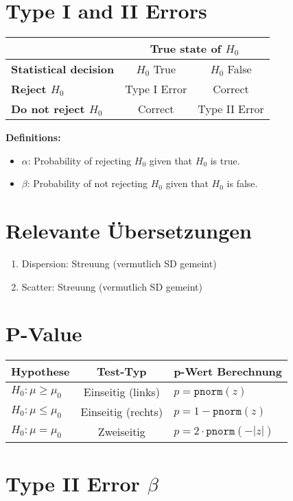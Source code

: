 
\section{Type I and II Errors}
\noindent
\begin{tabular}{|l|c|c|}
\hline
& \multicolumn{2}{c|}{\textbf{True state of } $H_0$}\\
\hline
\textbf{Statistical decision} & $H_0$ True & $H_0$ False\\
\hline
\textbf{Reject $H_0$} & Type I Error & Correct\\
\hline
\textbf{Do not reject $H_0$} & Correct & Type II Error\\
\hline
\end{tabular}


\textbf{Definitions:}
\begin{itemize}
    \item $\alpha$: Probability of rejecting $H_0$ given that $H_0$ is true.
    \item $\beta$: Probability of not rejecting $H_0$ given that $H_0$ is false.
\end{itemize}

\section{Relevante Übersetzungen}
\begin{enumerate}
    \item Dispersion: Streuung (vermutlich SD gemeint)
    \item Scatter: Streuung (vermutlich SD gemeint)
\end{enumerate}
\section{P-Value}
\noindent
\noindent
\begin{tabular}{lcl}
  \toprule
  \textbf{Hypothese}         & \textbf{Test-Typ}    & \textbf{p-Wert Berechnung} \\
  \midrule
  \(H_0: \mu \ge \mu_0\)      & Einseitig (links)   & \(p = \mathtt{pnorm}(z)\)   \\
  \(H_0: \mu \le \mu_0\)      & Einseitig (rechts)  & \(p = 1 - \mathtt{pnorm}(z)\) \\
  \(H_0: \mu = \mu_0\)        & Zweiseitig          & \(p = 2 \cdot \mathtt{pnorm}(-|z|)\) \\
  \bottomrule
\end{tabular}
\section{Type II Error $\beta$}

